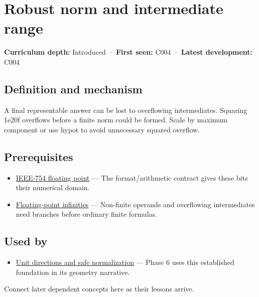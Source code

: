 \hypertarget{appendix-7f1e17dcafb1}{}\label{referencestart:appendix-7f1e17dcafb1}
\section{Robust norm and intermediate range}\label{appendix-7f1e17dcafb1-robust-norm-and-intermediate-range}

\textbf{Curriculum depth:} Introduced · \textbf{First seen:} C004 · \textbf{Latest development:} C004

\subsection{Definition and mechanism}\label{appendix-7f1e17dcafb1-definition-and-mechanism}

A final representable answer can be lost to overflowing intermediates. Squaring 1e20f overflows before a finite norm could be formed. Scale by maximum component or use hypot to avoid unnecessary squared overflow.

\subsection{Prerequisites}\label{appendix-7f1e17dcafb1-prerequisites}

\begin{itemize}
\tightlist
\item
  \hyperref[appendix-343615f49ddf]{IEEE-754 floating point} --- The format/arithmetic contract gives these bits their numerical domain.
\item
  \hyperref[appendix-eb336149c00a]{Floating-point infinities} --- Non-finite operands and overflowing intermediates need branches before ordinary finite formulas.
\end{itemize}

\subsection{Used by}\label{appendix-7f1e17dcafb1-used-by}

\begin{itemize}
\tightlist
\item
  \hyperref[appendix-f744e41b95b4]{Unit directions and safe normalization} --- Phase 6 uses this established foundation in its geometry narrative.
\end{itemize}

Connect later dependent concepts here as their lessons arrive.

